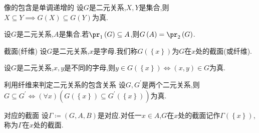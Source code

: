 \begin{proposition}{像的包含是单调递增的}{}
	设$G$是二元关系,$X,Y$是集合,则$X\subseteq Y\implies G\left(X\right)\subseteq G\left(Y\right)$为真.
\end{proposition}

\begin{corollary}{}{}
	设$G$是二元关系,$A$是集合.若$\pr_{1}\left(G\right)\subseteq A$,则$G\left(A\right)=\pr_{2}\left(G\right)$.
\end{corollary}

\begin{definition}{截面(纤维)}{}
	设$G$是二元关系,$x$是字母.我们称$G\left(\left\{x\right\}\right)$为$G$在$x$处的截面(或纤维).
\end{definition}

\begin{proposition}{}{}
	设$G$是二元关系,$x,y$是不同的字母,则$y\in G\left(\left\{x\right\}\right)\iff\left(x,y\right)\in G$为真.
\end{proposition}

\begin{proposition}{利用纤维来判定二元关系的包含关系}{}
	设$G,G^{\prime}$是两个二元关系,则$G\subseteq G^{\prime}\iff\left(\forall x\right)\left(G\left(\left\{x\right\}\right)\subseteq G^{\prime}\left(\left\{x\right\}\right)\right)$为真.
\end{proposition}

\begin{definition}{对应的截面}{}
	设$\Gamma\coloneq\left(G,A,B\right)$是对应.对任一$x\in A$,$G$在$x$处的截面记作$\Gamma\left(\left\{x\right\}\right)$,称为$\Gamma$在$x$处的截面.
\end{definition}

